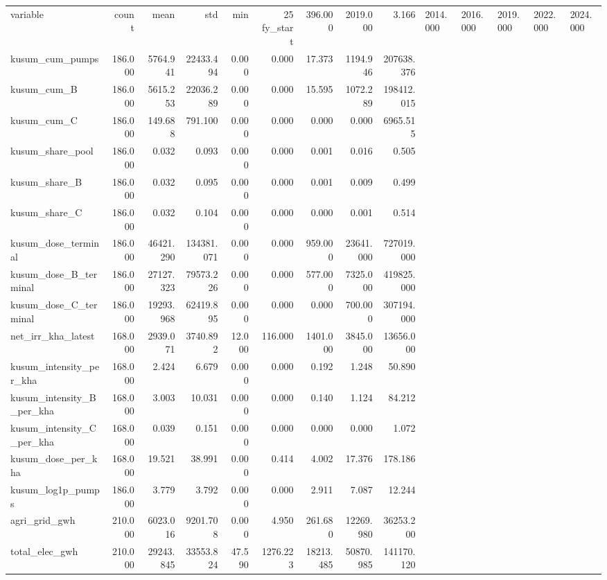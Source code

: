 \begin{tabular}{lrrrrrrrr}
\toprule
variable & count & mean & std & min & 25%
\midrule
fy_start & 396.000 & 2019.000 & 3.166 & 2014.000 & 2016.000 & 2019.000 & 2022.000 & 2024.000 \\
kusum_cum_pumps & 186.000 & 5764.941 & 22433.494 & 0.000 & 0.000 & 17.373 & 1194.946 & 207638.376 \\
kusum_cum_B & 186.000 & 5615.253 & 22036.289 & 0.000 & 0.000 & 15.595 & 1072.289 & 198412.015 \\
kusum_cum_C & 186.000 & 149.688 & 791.100 & 0.000 & 0.000 & 0.000 & 0.000 & 6965.515 \\
kusum_share_pool & 186.000 & 0.032 & 0.093 & 0.000 & 0.000 & 0.001 & 0.016 & 0.505 \\
kusum_share_B & 186.000 & 0.032 & 0.095 & 0.000 & 0.000 & 0.001 & 0.009 & 0.499 \\
kusum_share_C & 186.000 & 0.032 & 0.104 & 0.000 & 0.000 & 0.000 & 0.001 & 0.514 \\
kusum_dose_terminal & 186.000 & 46421.290 & 134381.071 & 0.000 & 0.000 & 959.000 & 23641.000 & 727019.000 \\
kusum_dose_B_terminal & 186.000 & 27127.323 & 79573.226 & 0.000 & 0.000 & 577.000 & 7325.000 & 419825.000 \\
kusum_dose_C_terminal & 186.000 & 19293.968 & 62419.895 & 0.000 & 0.000 & 0.000 & 700.000 & 307194.000 \\
net_irr_kha_latest & 168.000 & 2939.071 & 3740.892 & 12.000 & 116.000 & 1401.000 & 3845.000 & 13656.000 \\
kusum_intensity_per_kha & 168.000 & 2.424 & 6.679 & 0.000 & 0.000 & 0.192 & 1.248 & 50.890 \\
kusum_intensity_B_per_kha & 168.000 & 3.003 & 10.031 & 0.000 & 0.000 & 0.140 & 1.124 & 84.212 \\
kusum_intensity_C_per_kha & 168.000 & 0.039 & 0.151 & 0.000 & 0.000 & 0.000 & 0.000 & 1.072 \\
kusum_dose_per_kha & 168.000 & 19.521 & 38.991 & 0.000 & 0.414 & 4.002 & 17.376 & 178.186 \\
kusum_log1p_pumps & 186.000 & 3.779 & 3.792 & 0.000 & 0.000 & 2.911 & 7.087 & 12.244 \\
agri_grid_gwh & 210.000 & 6023.016 & 9201.708 & 0.000 & 4.950 & 261.680 & 12269.980 & 36253.200 \\
total_elec_gwh & 210.000 & 29243.845 & 33553.824 & 47.590 & 1276.223 & 18213.485 & 50870.985 & 141170.120 \\

\end{tabular}
